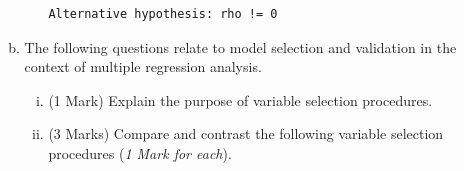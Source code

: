\documentclass[a4paper,12pt]{article}
\begin{document}
\begin{enumerate}
\begin{enumerate}[(a)]
\begin{enumerate}[(i)]
\begin{framed}
\begin{verbatim}
Alternative hypothesis: rho != 0
\end{verbatim}
\end{framed}
\end{enumerate}





\item The following questions relate to model selection and validation in the context of multiple
regression analysis.
\begin{enumerate}[(i)]
\item (1 Mark) Explain the purpose of variable selection procedures.
\item (3 Marks) Compare and contrast the following variable selection procedures (\textit{1 Mark for each}).
\begin{itemize}


\end{itemize}
\end{enumerate}
\end{enumerate}
\end{enumerate}
\end{document}
